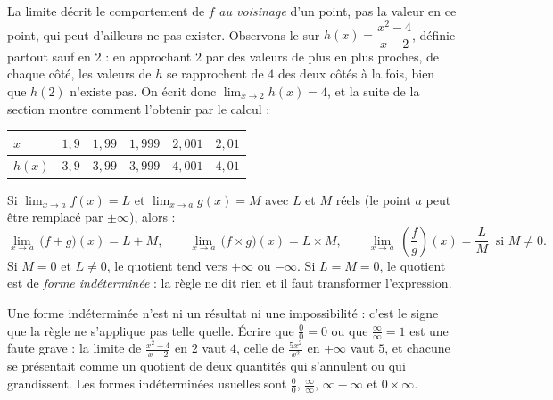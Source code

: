 La limite décrit le comportement de $f$ \emph{au voisinage} d'un point, pas la valeur en ce point, qui peut d'ailleurs ne pas exister. Observons-le sur $h(x) = \dfrac{x^{2}-4}{x-2}$, définie partout sauf en $2$ : en approchant $2$ par des valeurs de plus en plus proches, de chaque côté, les valeurs de $h$ se rapprochent de $4$ des deux côtés à la fois, bien que $h(2)$ n'existe pas. On écrit donc $\lim_{x \to 2} h(x) = 4$, et la suite de la section montre comment l'obtenir par le calcul :

\begin{center}
\label{ch3:tab:limites}
\begin{tabular}{C{1.7cm}C{1.7cm}C{1.7cm}C{1.7cm}C{1.7cm}C{1.7cm}}
\toprule
$x$ & $1{,}9$ & $1{,}99$ & $1{,}999$ & $2{,}001$ & $2{,}01$ \\
\midrule
$h(x)$ & $3{,}9$ & $3{,}99$ & $3{,}999$ & $4{,}001$ & $4{,}01$ \\
\bottomrule
\end{tabular}
\end{center}

\begin{propriete}
Si $\lim_{x \to a} f(x) = L$ et $\lim_{x \to a} g(x) = M$ avec $L$ et $M$ réels (le point $a$ peut être remplacé par $\pm\infty$), alors :
\[
\lim_{x \to a}\,\bigl(f + g\bigr)(x) = L + M, \qquad \lim_{x \to a}\,\bigl(f \times g\bigr)(x) = L \times M, \qquad \lim_{x \to a}\,\left(\frac{f}{g}\right)(x) = \frac{L}{M} \ \text{ si } M \neq 0.
\]
Si $M = 0$ et $L \neq 0$, le quotient tend vers $+\infty$ ou $-\infty$. Si $L = M = 0$, le quotient est de \emph{forme indéterminée} : la règle ne dit rien et il faut transformer l'expression.
\end{propriete}

\begin{attention}
Une forme indéterminée n'est ni un résultat ni une impossibilité : c'est le signe que la règle ne s'applique pas telle quelle. Écrire que $\frac{0}{0} = 0$ ou que $\frac{\infty}{\infty} = 1$ est une faute grave : la limite de $\frac{x^{2}-4}{x-2}$ en $2$ vaut $4$, celle de $\frac{5x^{2}}{x^{2}}$ en $+\infty$ vaut $5$, et chacune se présentait comme un quotient de deux quantités qui s'annulent ou qui grandissent. Les formes indéterminées usuelles sont $\frac{0}{0}$, $\frac{\infty}{\infty}$, $\infty - \infty$ et $0 \times \infty$.
\end{attention}

